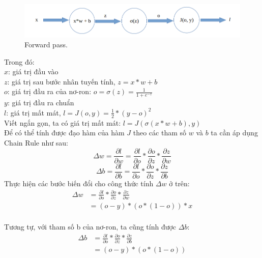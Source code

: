 \documentclass[a4paper,14pt]{extreport}
\begin{document}
\begin{figure}[h]
    \centering
    \includegraphics[scale=0.4]{img/back-propagation.png}
    \caption{Forward pass.}
    \label{fig:forward}
\end{figure}

Trong đó:\\
$x$: giá trị đầu vào \\
$z$: giá trị sau bước nhân tuyến tính, $ z = x * w + b $ \\
$o$: giá trị đầu ra của nơ-ron: $ o = \sigma(z) = \frac{1}{1+e^{-z}} $ \\
$y$: giá trị đầu ra chuẩn \\
$l$: giá trị mất mát, $l = J(o, y) = \frac{1}{2} * (y - o)^{2}$ \\
Viết ngắn gọn, ta có giá trị mất mát: $l = J(\sigma(x*w + b), y)$ \\
Để có thể tính được đạo hàm của hàm $J$ theo các tham số $w$ và $b$ ta cần áp dụng Chain Rule như sau:
\[ \Delta w = \frac{\partial l}{\partial w} = \frac{\partial l}{\partial o} * \frac{\partial o}{\partial z} * \frac{\partial z}{\partial w} \]
\[ \Delta b = \frac{\partial l}{\partial b} = \frac{\partial l}{\partial o} * \frac{\partial o}{\partial z} * \frac{\partial z}{\partial b} \]
Thực hiện các bước biến đổi cho công thức tính $\Delta w$ ở trên:
\begin{equation*} \label{eq1}
\begin{split}
\Delta w & = \frac{\partial l}{\partial o} * \frac{\partial o}{\partial z} * \frac{\partial z}{\partial w} \\
    & = (o - y) * (o * (1 - o)) * x  \\
\end{split}
\end{equation*}

Tương tự, với tham số b của nơ-ron, ta cũng tính được $\Delta b$:
\begin{equation*} \label{eq2}
\begin{split}
\Delta b & = \frac{\partial l}{\partial o} * \frac{\partial o}{\partial z} * \frac{\partial z}{\partial b} \\
    & = (o - y) * (o * (1 - o)) \\
\end{split}
\end{equation*}
\end{document}
